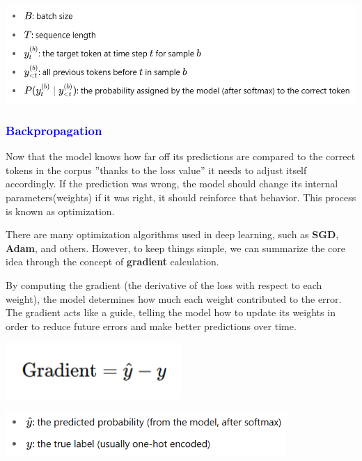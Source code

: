\documentclass[12pt]{article}
\begin{document}
\begin{center}
    \includegraphics[width=\textwidth]{images/formula9.png}
\end{center}
\newpage

\textcolor{blue}{\subsubsection{Backpropagation}}
Now that the model knows how far off its predictions are compared to the correct tokens in the corpus ''thanks to the loss value'' it needs to adjust itself accordingly. If the prediction was wrong, the model should change its internal parameters(weights) if it was right, it should reinforce that behavior. This process is known as optimization.

There are many optimization algorithms used in deep learning, such as \textbf{SGD}, \textbf{Adam}, and others. However, to keep things simple, we can summarize the core idea through the concept of \textbf{gradient} calculation.

By computing the gradient (the derivative of the loss with respect to each weight), the model determines how much each weight contributed to the error. The gradient acts like a guide, telling the model how to update its weights in order to reduce future errors and make better predictions over time.

\begin{center}
    \includegraphics[width=0.5\textwidth]{images/formula10.png}
\end{center}
\includegraphics[width=0.8\textwidth]{images/formula11.png}

\vspace*{1cm}
\end{document}
